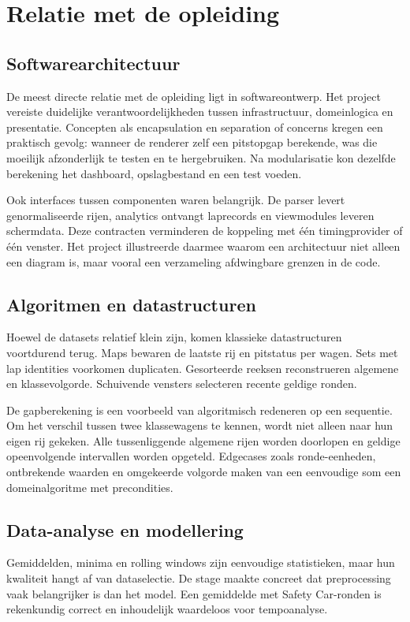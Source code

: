 \chapter{Relatie met de opleiding}
\label{chap:opleiding}

\section{Softwarearchitectuur}
De meest directe relatie met de opleiding ligt in softwareontwerp. Het project vereiste duidelijke verantwoordelijkheden tussen infrastructuur, domeinlogica en presentatie. Concepten als encapsulation en separation of concerns kregen een praktisch gevolg: wanneer de renderer zelf een pitstopgap berekende, was die moeilijk afzonderlijk te testen en te hergebruiken. Na modularisatie kon dezelfde berekening het dashboard, opslagbestand en een test voeden.

Ook interfaces tussen componenten waren belangrijk. De parser levert genormaliseerde rijen, analytics ontvangt laprecords en viewmodules leveren schermdata. Deze contracten verminderen de koppeling met één timingprovider of één venster. Het project illustreerde daarmee waarom een architectuur niet alleen een diagram is, maar vooral een verzameling afdwingbare grenzen in de code.

\section{Algoritmen en datastructuren}
Hoewel de datasets relatief klein zijn, komen klassieke datastructuren voortdurend terug. Maps bewaren de laatste rij en pitstatus per wagen. Sets met lap identities voorkomen duplicaten. Gesorteerde reeksen reconstrueren algemene en klassevolgorde. Schuivende vensters selecteren recente geldige ronden.

De gapberekening is een voorbeeld van algoritmisch redeneren op een sequentie. Om het verschil tussen twee klassewagens te kennen, wordt niet alleen naar hun eigen rij gekeken. Alle tussenliggende algemene rijen worden doorlopen en geldige opeenvolgende intervallen worden opgeteld. Edgecases zoals ronde-eenheden, ontbrekende waarden en omgekeerde volgorde maken van een eenvoudige som een domeinalgoritme met precondities.

\section{Data-analyse en modellering}
Gemiddelden, minima en rolling windows zijn eenvoudige statistieken, maar hun kwaliteit hangt af van dataselectie. De stage maakte concreet dat preprocessing vaak belangrijker is dan het model. Een gemiddelde met Safety Car-ronden is rekenkundig correct en inhoudelijk waardeloos voor tempoanalyse.


